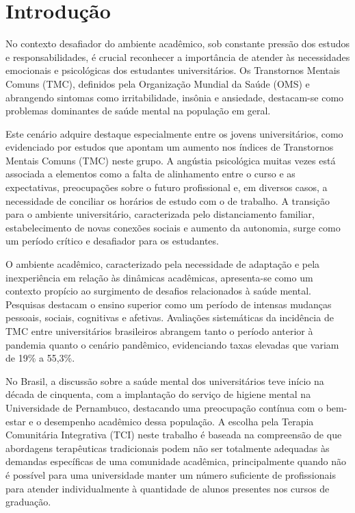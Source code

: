 \chapter*[Introdução]{Introdução}
No contexto desafiador do ambiente acadêmico, sob constante pressão dos estudos e responsabilidades, é crucial reconhecer a importância de atender às necessidades emocionais e psicológicas dos estudantes universitários. Os Transtornos Mentais Comuns (TMC), definidos pela Organização Mundial da Saúde (OMS) e abrangendo sintomas como irritabilidade, insônia e ansiedade, destacam-se como problemas dominantes de saúde mental na população em geral. \cite{RODRIGUES}

Este cenário adquire destaque especialmente entre os jovens universitários, como evidenciado por estudos que apontam um aumento nos índices de Transtornos Mentais Comuns (TMC) neste grupo.\cite{DUFFY} A angústia psicológica muitas vezes está associada a elementos como a falta de alinhamento entre o curso e as expectativas, preocupações sobre o futuro profissional e, em diversos casos, a necessidade de conciliar os horários de estudo com o de trabalho. \cite{BARROS} A transição para o ambiente universitário, caracterizada pelo distanciamento familiar, estabelecimento de novas conexões sociais e aumento da autonomia, surge como um período crítico e desafiador para os estudantes. \cite{PATTON}

O ambiente acadêmico, caracterizado pela necessidade de adaptação e pela inexperiência em relação às dinâmicas acadêmicas, apresenta-se como um contexto propício ao surgimento de desafios relacionados à saúde mental.\cite{RODRIGUES} Pesquisas destacam o ensino superior como um período de intensas mudanças pessoais, sociais, cognitivas e afetivas. \cite{CASTRO} Avaliações sistemáticas da incidência de TMC entre universitários brasileiros abrangem tanto o período anterior à pandemia quanto o cenário pandêmico, evidenciando taxas elevadas que variam de 19\% a 55,3\%.\cite{LOPES}

No Brasil, a discussão sobre a saúde mental dos universitários teve início na década de cinquenta, com a implantação do serviço de higiene mental na Universidade de Pernambuco, destacando uma preocupação contínua com o bem-estar e o desempenho acadêmico dessa população.\cite{CASTRO} A escolha pela Terapia Comunitária Integrativa (TCI) neste trabalho é baseada na compreensão de que abordagens terapêuticas tradicionais podem não ser totalmente adequadas às demandas específicas de uma comunidade acadêmica, principalmente quando não é possível para uma universidade manter um número suficiente de profissionais para atender individualmente à quantidade de alunos presentes nos cursos de graduação.

